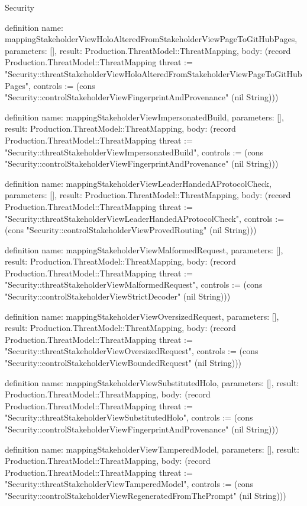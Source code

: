 \begin{lexlean}{Security}
\begin{semanticmodule}
definition{
  name: mappingStakeholderViewHoloAlteredFromStakeholderViewPageToGitHubPages,
  parameters: [],
  result: Production.ThreatModel::ThreatMapping,
  body: (record Production.ThreatModel::ThreatMapping {threat := "Security::threatStakeholderViewHoloAlteredFromStakeholderViewPageToGitHubPages", controls := (cons "Security::controlStakeholderViewFingerprintAndProvenance" (nil String))})
}

definition{
  name: mappingStakeholderViewImpersonatedBuild,
  parameters: [],
  result: Production.ThreatModel::ThreatMapping,
  body: (record Production.ThreatModel::ThreatMapping {threat := "Security::threatStakeholderViewImpersonatedBuild", controls := (cons "Security::controlStakeholderViewFingerprintAndProvenance" (nil String))})
}

definition{
  name: mappingStakeholderViewLeaderHandedAProtocolCheck,
  parameters: [],
  result: Production.ThreatModel::ThreatMapping,
  body: (record Production.ThreatModel::ThreatMapping {threat := "Security::threatStakeholderViewLeaderHandedAProtocolCheck", controls := (cons "Security::controlStakeholderViewProvedRouting" (nil String))})
}

definition{
  name: mappingStakeholderViewMalformedRequest,
  parameters: [],
  result: Production.ThreatModel::ThreatMapping,
  body: (record Production.ThreatModel::ThreatMapping {threat := "Security::threatStakeholderViewMalformedRequest", controls := (cons "Security::controlStakeholderViewStrictDecoder" (nil String))})
}

definition{
  name: mappingStakeholderViewOversizedRequest,
  parameters: [],
  result: Production.ThreatModel::ThreatMapping,
  body: (record Production.ThreatModel::ThreatMapping {threat := "Security::threatStakeholderViewOversizedRequest", controls := (cons "Security::controlStakeholderViewBoundedRequest" (nil String))})
}

definition{
  name: mappingStakeholderViewSubstitutedHolo,
  parameters: [],
  result: Production.ThreatModel::ThreatMapping,
  body: (record Production.ThreatModel::ThreatMapping {threat := "Security::threatStakeholderViewSubstitutedHolo", controls := (cons "Security::controlStakeholderViewFingerprintAndProvenance" (nil String))})
}

definition{
  name: mappingStakeholderViewTamperedModel,
  parameters: [],
  result: Production.ThreatModel::ThreatMapping,
  body: (record Production.ThreatModel::ThreatMapping {threat := "Security::threatStakeholderViewTamperedModel", controls := (cons "Security::controlStakeholderViewRegeneratedFromThePrompt" (nil String))})
}


\end{semanticmodule}
\end{lexlean}
